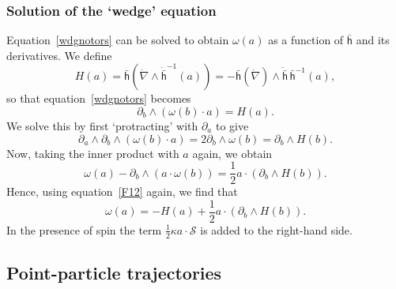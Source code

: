 \documentclass[a4paper]{article}
\numberwithin{equation}{section}
\newcommand{\dt}{\! \cdot \!}
\newcommand{\wdg}{\! \wedge \!}
\newcommand{\half}{{\textstyle \frac{1}{2}}}
\newcommand{\eqv}{=}
\newcommand{\kap}{\kappa}
\newcommand{\om}{\omega}
\newcommand{\cls}{{\mathcal{S}}}
\newcommand{\da}{\partial_a}
\newcommand{\db}{\partial_b}
\newcommand{\lbh}{\bar{\mathsf{h}}}
\newcommand{\ho}{\lbh}
\newcommand{\grad}{\nabla}
\newcommand{\dgrad}{\dot{\grad}}
\newcommand{\dho}{\dot{\lbh}}
\begin{document}
\subsubsection*{Solution of the `wedge' equation} 

Equation~\eqref{wdgnotors} can be solved to obtain $\om(a)$ as a
function of $\ho$ and its derivatives.  We define
%
\begin{equation}
H(a) \eqv \ho(\dgrad \wdg \dot{\ho}^{-1}(a)) = - \ho(\dgrad) \wdg
\dho\,\ho^{-1}(a), 
\label{F11.5}
\end{equation} 
%
so that equation~\eqref{wdgnotors} becomes
%
\begin{equation}
\db \wdg (\om(b) \dt a) = H(a).
\label{F12}
\end{equation}
%
We solve this by first `protracting' with $\da$ to give
%
\begin{equation}
\da \wdg \db \wdg (\om(b) \dt a) = 2 \db \wdg \om(b) = \db \wdg H(b).
\end{equation}
%
Now, taking the inner product with $a$ again, we obtain
%
\begin{equation}
\om(a) - \db \wdg (a \dt \om(b)) = \half a \dt (\db \wdg H(b)).
\end{equation}
%
Hence, using equation~\eqref{F12} again, we find that
%
\begin{equation}
\om(a) = -H(a) + \half a \dt (\db \wdg H(b)) .
\label{F15}
\end{equation}
%
In the presence of spin the term $\half\kap a\dt\cls$ is added to the
right-hand side.  



\subsection{Point-particle trajectories}
\label{F-PP}
\end{document}
